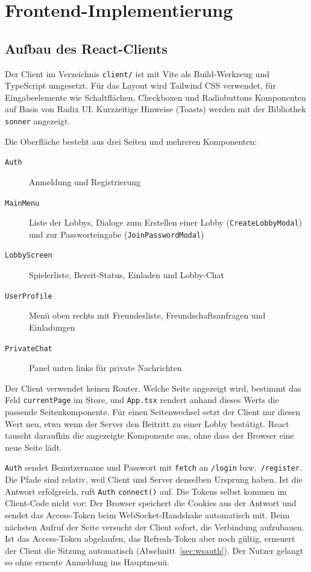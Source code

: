 \chapter{Frontend-Implementierung}
\label{kap:frontend}
\verfasser{\autorDG}

\section{Aufbau des React-Clients}

Der Client im Verzeichnis \texttt{client/} ist mit Vite als Build-Werkzeug und TypeScript umgesetzt. Für das Layout wird Tailwind CSS verwendet, für Eingabeelemente wie Schaltflächen, Checkboxen und Radiobuttons Komponenten auf Basis von Radix UI. Kurzzeitige Hinweise (Toasts) werden mit der Bibliothek \texttt{sonner} angezeigt.

Die Oberfläche besteht aus drei Seiten und mehreren Komponenten:

\begin{description}
  \item[\texttt{Auth}] Anmeldung und Registrierung
  \item[\texttt{MainMenu}] Liste der Lobbys, Dialoge zum Erstellen einer Lobby (\texttt{CreateLobbyModal}) und zur Passworteingabe (\texttt{JoinPasswordModal})
  \item[\texttt{LobbyScreen}] Spielerliste, Bereit-Status, Einladen und Lobby-Chat
  \item[\texttt{UserProfile}] Menü oben rechts mit Freundesliste, Freundschaftsanfragen und Einladungen
  \item[\texttt{PrivateChat}] Panel unten links für private Nachrichten
\end{description}

Der Client verwendet keinen Router. Welche Seite angezeigt wird, bestimmt das Feld \texttt{currentPage} im Store, und \texttt{App.tsx} rendert anhand dieses Werts die passende Seitenkomponente. Für einen Seitenwechsel setzt der Client nur diesen Wert neu, etwa wenn der Server den Beitritt zu einer Lobby bestätigt. React tauscht daraufhin die angezeigte Komponente aus, ohne dass der Browser eine neue Seite lädt.

\texttt{Auth} sendet Benutzername und Passwort mit \texttt{fetch} an \texttt{/login} bzw.\ \texttt{/register}. Die Pfade sind relativ, weil Client und Server denselben Ursprung haben. Ist die Antwort erfolgreich, ruft \texttt{Auth} \texttt{connect()} auf. Die Tokens selbst kommen im Client-Code nicht vor: Der Browser speichert die Cookies aus der Antwort und sendet das Access-Token beim WebSocket-Handshake automatisch mit. Beim nächsten Aufruf der Seite versucht der Client sofort, die Verbindung aufzubauen. Ist das Access-Token abgelaufen, das Refresh-Token aber noch gültig, erneuert der Client die Sitzung automatisch (Abschnitt~\ref{sec:wsauth}). Der Nutzer gelangt so ohne erneute Anmeldung ins Hauptmenü.


